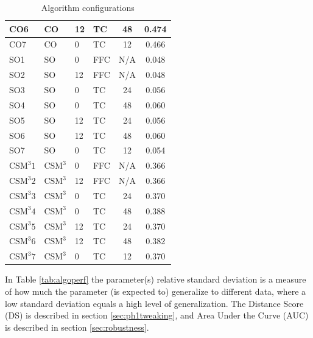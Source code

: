 \documentclass[12pt]{article}
\begin{document}
\begin{table}
\begin{tabular}{| l | l | p{2cm} | p{2cm} | c | c | }
    CO6 & CO & 12 & TC & 48 & 0.474 \\\hline
    CO7 & CO & 0 & TC & 12 & 0.466 \\\hline\hline
%
    SO1 & SO & 0 & FFC & N/A & 0.048 \\\hline
    SO2 & SO & 12 & FFC & N/A & 0.048 \\\hline
    SO3 & SO & 0 & TC & 24 & 0.056 \\\hline
    SO4 & SO & 0 & TC & 48 & 0.060 \\\hline
    SO5 & SO & 12 & TC & 24 & 0.056 \\\hline
    SO6 & SO & 12 & TC & 48 & 0.060 \\\hline
    SO7 & SO & 0 & TC & 12 & 0.054 \\\hline\hline
%
    $\text{CSM}^{3}1$ & $\text{CSM}^{3}$  & 0 & FFC & N/A & 0.366 \\\hline
    $\text{CSM}^{3}2$ &$\text{CSM}^{3}$ & 12 & FFC & N/A & 0.366 \\\hline
    $\text{CSM}^{3}3$ &$\text{CSM}^{3}$ & 0 & TC & 24 & 0.370 \\\hline
    $\text{CSM}^{3}4$ &$\text{CSM}^{3}$ & 0 & TC & 48 & 0.388 \\\hline
    $\text{CSM}^{3}5$ &$\text{CSM}^{3}$ & 12 & TC & 24 & 0.370 \\\hline
    $\text{CSM}^{3}6$ &$\text{CSM}^{3}$ & 12 & TC & 48 & 0.382 \\\hline
    $\text{CSM}^{3}7$ &$\text{CSM}^{3}$ & 0 & TC & 12 & 0.370 \\\hline
%
  \end{tabular}
\caption{Algorithm configurations}
\label{tab:algoconfigs}
\end{table}
%
In Table \ref{tab:algoperf} the parameter(s) relative standard deviation is a measure of how much the parameter (is expected to) generalize to different data, where a low standard deviation equals a high level of generalization. The Distance Score (DS) is described in section \ref{sec:ph1tweaking}, and Area Under the Curve (AUC) is described in section \ref{sec:robustness}.\\
%
\end{document}
